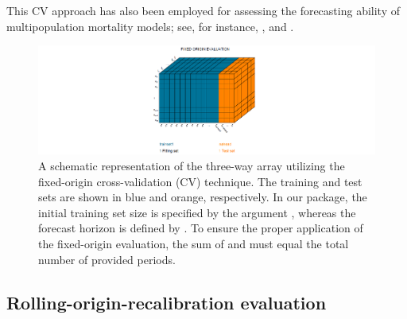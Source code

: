 This CV approach has also been employed for assessing the forecasting ability of multipopulation mortality models; see, for instance, \citet{Danesi2015}, \citet{Antonio2017} and \citet{Bozikas2020}.

\begin{figure}[h!]
\centering
\includegraphics*[width=\textwidth]{FIXED-ORIGIN.png}
\caption{A schematic representation of the three-way array utilizing the fixed-origin cross-validation (CV) technique. The training and test sets are shown in blue and orange, respectively. In our package, the initial training set size is specified by the argument , whereas the forecast horizon is defined by . To ensure the proper application of the fixed-origin evaluation, the sum of  and  must equal the total number of provided periods. }
\label{fig1}
\end{figure}

\subsection{Rolling-origin-recalibration evaluation}

